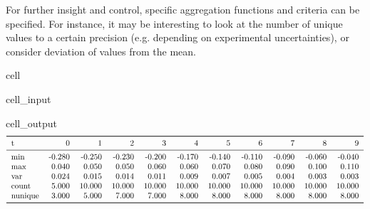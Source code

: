 \documentclass[letterpaper,table,10pt,english]{jupyterBook}
\begin{document}
\sphinxAtStartPar
For further insight and control, specific aggregation functions and criteria can be specified. For instance, it may be interesting to look at the number of unique values to a certain precision (e.g. depending on experimental uncertainties), or consider deviation of values from the mean.

\begin{sphinxuseclass}{cell}\begin{sphinxVerbatimInput}

\begin{sphinxuseclass}{cell_input}
\begin{sphinxVerbatim}[commandchars=\\\{\}]
  
\PYG{p}{[}\PYG{p}{]}
\end{sphinxVerbatim}

\end{sphinxuseclass}\end{sphinxVerbatimInput}
\begin{sphinxVerbatimOutput}

\begin{sphinxuseclass}{cell_output}\begin{equation*}
\begin{split}\begin{tabular}{lrrrrrrrrrr}
\toprule
t &      0 &       1 &       2 &       3 &       4 &       5 &       6 &       7 &       8 &       9 \\
\midrule
min     & -0.280 &  -0.250 &  -0.230 &  -0.200 &  -0.170 &  -0.140 &  -0.110 &  -0.090 &  -0.060 &  -0.040 \\
max     &  0.040 &   0.050 &   0.050 &   0.060 &   0.060 &   0.070 &   0.080 &   0.090 &   0.100 &   0.110 \\
var     &  0.024 &   0.015 &   0.014 &   0.011 &   0.009 &   0.007 &   0.005 &   0.004 &   0.003 &   0.003 \\
count   &  5.000 &  10.000 &  10.000 &  10.000 &  10.000 &  10.000 &  10.000 &  10.000 &  10.000 &  10.000 \\
nunique &  3.000 &   5.000 &   7.000 &   7.000 &   8.000 &   8.000 &   8.000 &   8.000 &   8.000 &   8.000 \\
\bottomrule
\end{tabular}\end{split}
\end{equation*}
\end{sphinxuseclass}\end{sphinxVerbatimOutput}

\end{sphinxuseclass}
\end{document}
